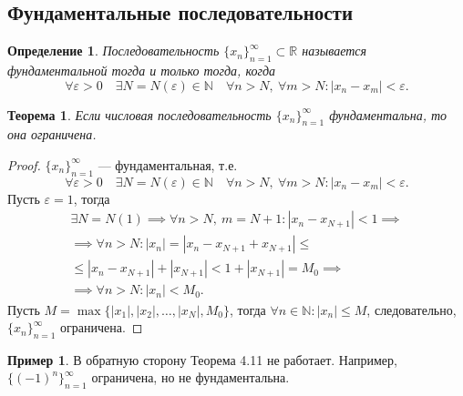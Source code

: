 \documentclass[a4paper,12pt]{article} %
\newtheorem{definition}{Определение}[section]
\newtheorem{theorem}{Теорема}[section]
\theoremstyle{remark}
\theoremstyle{definition}
\newtheorem{exmp}{Пример}[section]
\begin{document}
\subsection{Фундаментальные последовательности}
\begin{definition}
	Последовательность $\{x_n\}_{n=1}^{\infty} \subset  \mathbb{R}$ называется фундаментальной тогда и только тогда, когда
	\[
	\forall \varepsilon>0 \quad \exists N=N(\varepsilon) \in  \mathbb{N} \quad \forall n>N, \ \forall m>N : |x_n-x_m|<\varepsilon
	.\] 
\end{definition}

\begin{theorem}
	Если числовая последовательность $\{x_n\}_{n=1}^{\infty}$ фундаментальна, то она ограничена.
\end{theorem}
\begin{proof}
	$\{x_n\}_{n=1}^{\infty}$ --- фундаментальная, т.е. 
	\[
	\forall \varepsilon>0 \quad \exists N=N(\varepsilon)\in \mathbb{N} \quad \forall n>N, \ \forall m>N : |x_n-x_m| < \varepsilon
	.\] 
	Пусть $\varepsilon=1$, тогда
	\begin{multline}
	\exists N=N(1) \implies \forall n>N, \ m=N+1 : |x_n - x_{N+1}|<1 \implies \\
	\implies \forall n>N : |x_n| = |x_n - x_{N+1} + x_{N+1}| \le \\
	\le |x_n - x_{N+1}| + |x_{N+1}| < 1 + |x_{N+1}| = M_0 \implies \\
	\implies \forall n>N : |x_n| < M_0.
	\end{multline}
	Пусть $M = \max \{|x_1|, |x_2|, \ldots, |x_N|, M_0\}$, тогда $\forall n\in \mathbb{N} : |x_n| \le M$, следовательно, $\{x_n\}_{n=1}^{\infty}$ ограничена.
\end{proof}

\begin{exmp}
	В обратную сторону Теорема 4.11 не работает. Например, $\{(-1)^{n}\}_{n=1}^{\infty}$ ограничена, но не фундаментальна.
	\begin{center}
	\end{center}
\end{exmp}
\end{document}
